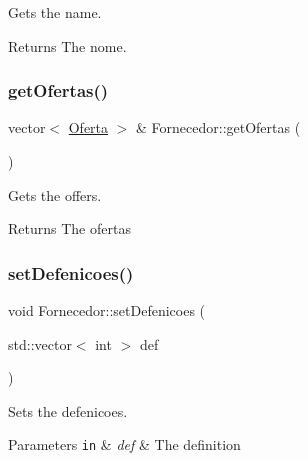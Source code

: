 Gets the name. 

\begin{DoxyReturn}{Returns}
The nome. 
\end{DoxyReturn}
\mbox{\label{classFornecedor_a7ef7f5f79e2c61aaca5d60c06b2a0051}} 
\subsubsection{\texorpdfstring{get\+Ofertas()}{getOfertas()}}
{\footnotesize\ttfamily vector$<$ \hyperlink{classOferta}{Oferta} $>$ \& Fornecedor\+::get\+Ofertas (\begin{DoxyParamCaption}{ }\end{DoxyParamCaption})}



Gets the offers. 

\begin{DoxyReturn}{Returns}
The ofertas 
\end{DoxyReturn}
\mbox{\label{classFornecedor_a63bb5795c45d195995de437620503d98}} 
\subsubsection{\texorpdfstring{set\+Defenicoes()}{setDefenicoes()}}
{\footnotesize\ttfamily void Fornecedor\+::set\+Defenicoes (\begin{DoxyParamCaption}\item[{std\+::vector$<$ int $>$}]{def }\end{DoxyParamCaption})\hspace{0.3cm}{\ttfamily [inline]}}



Sets the defenicoes. 


\begin{DoxyParams}[1]{Parameters}
\mbox{\tt in}  & {\em def} & The definition \\
\hline
\end{DoxyParams}
\mbox{\label{classFornecedor_a240f4abc6ac49f030c93679b3628e222}} 
